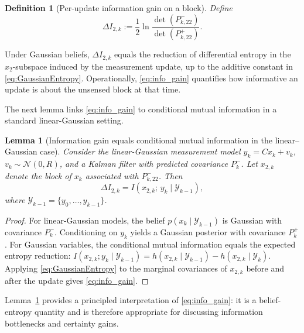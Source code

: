 \documentclass[final,5p,times,twocolumn]{elsarticle}
\newtheorem{lemma}{Lemma}
\newtheorem{definition}{Definition}
\begin{document}
\begin{definition}[Per-update information gain on a block]
	\label{def:info_gain}
	Define
	\begin{equation}
		\Delta I_{2,k}
		:= \frac{1}{2}\ln\frac{\det(P_{k,22}^-)}{\det(P_{k,22}^+)}.
		\label{eq:info_gain}
	\end{equation}
\end{definition}

Under Gaussian beliefs, $\Delta I_{2,k}$ equals the reduction of differential entropy in the $x_2$-subspace induced by the measurement update, up to the additive constant in \eqref{eq:GaussianEntropy}. Operationally, \eqref{eq:info_gain} quantifies how informative an update is about the unsensed block at that time.

The next lemma links \eqref{eq:info_gain} to conditional mutual information in a standard linear-Gaussian setting.

\begin{lemma}[Information gain equals conditional mutual information in the linear--Gaussian case]
	\label{lem:info_gain_CMI}
	Consider the linear-Gaussian measurement model
	$y_k = C x_k + v_k$, $v_k\sim\mathcal{N}(0,R)$,
	and a Kalman filter with predicted covariance $P_k^-$. Let $x_{2,k}$ denote the block of $x_k$ associated with $P_{k,22}^-$. Then
	\begin{equation}
		\Delta I_{2,k} = I(x_{2,k};\, y_k \mid \mathcal{Y}_{k-1}),
		\label{eq:IG_equals_CMI}
	\end{equation}
	where $\mathcal{Y}_{k-1}=\{y_0,\dots,y_{k-1}\}$.
\end{lemma}

\begin{proof}
	For linear-Gaussian models, the belief $p(x_k\mid\mathcal{Y}_{k-1})$ is Gaussian with covariance $P_k^-$. Conditioning on $y_k$ yields a Gaussian posterior with covariance $P_k^+$. For Gaussian variables, the conditional mutual information equals the expected entropy reduction:
	$I(x_{2,k};y_k\mid\mathcal{Y}_{k-1})=h(x_{2,k}\mid\mathcal{Y}_{k-1})-h(x_{2,k}\mid\mathcal{Y}_k)$.
	Applying \eqref{eq:GaussianEntropy} to the marginal covariances of $x_{2,k}$ before and after the update gives \eqref{eq:info_gain}.
\end{proof}

Lemma~\ref{lem:info_gain_CMI} provides a principled interpretation of \eqref{eq:info_gain}: it is a belief-entropy quantity and is therefore appropriate for discussing information bottlenecks and certainty gains.
\end{document}

